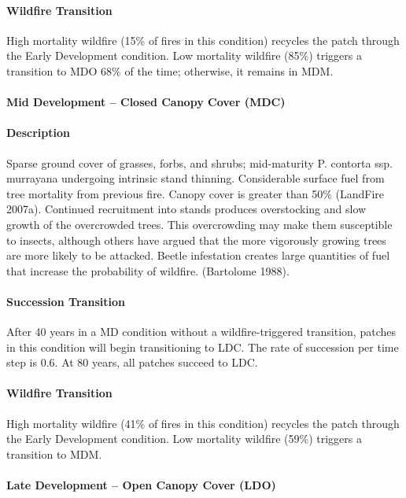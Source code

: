 \paragraph{Wildfire Transition} High mortality wildfire (15\% of fires in this condition) recycles the patch through the Early Development condition. Low mortality wildfire (85\%) triggers a transition to MDO 68\% of the time; otherwise, it remains in MDM.

\noindent\hrulefill

\paragraph{Mid Development – Closed Canopy Cover (MDC)}

\paragraph{Description} Sparse ground cover of grasses, forbs, and shrubs; mid-maturity P. contorta ssp. murrayana undergoing intrinsic stand thinning. Considerable surface fuel from tree mortality from previous fire. Canopy cover is greater than 50\% (LandFire 2007a).
Continued recruitment into stands produces overstocking and slow growth of the overcrowded trees. This overcrowding may make them susceptible to insects, although others have argued that the more vigorously growing trees are more likely to be attacked. Beetle infestation creates large quantities of fuel that increase the probability of wildfire. (Bartolome 1988).


\paragraph{Succession Transition} After 40 years in a MD condition without a wildfire-triggered transition, patches in this condition will begin transitioning to LDC. The rate of succession per time step is 0.6. At 80 years, all patches succeed to LDC.

\paragraph{Wildfire Transition} High mortality wildfire (41\% of fires in this condition) recycles the patch through the Early Development condition. Low mortality wildfire (59\%) triggers a transition to MDM.

\noindent\hrulefill


\paragraph{Late Development – Open Canopy Cover (LDO)}

